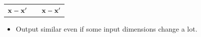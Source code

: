 {\begin{tabular}{ccc}
 ${\bf{x}} - {\bf{x}}'$ & & ${\bf{x}} - {\bf{x}}'$
\end{tabular}

\vspace{\baselineskip}
\begin{itemize}
	\item Output similar even if some input dimensions change a lot.
\end{itemize}
}




